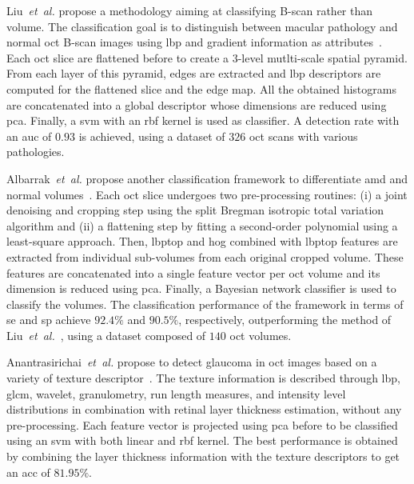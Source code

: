 %
Liu~\textit{et~al.} propose a methodology aiming at classifying B-scan rather than volume.
The classification goal is to distinguish between macular pathology and normal \gls{oct} B-scan images using \gls{lbp} and gradient information as attributes~\cite{Liu2011}.
%
Each \gls{oct} slice are flattened before to create a $3$-level mutlti-scale spatial pyramid.
From each layer of this pyramid, edges are extracted and \gls{lbp} descriptors are computed for the flattened slice and the edge map.
All the obtained histograms are concatenated into a global descriptor whose dimensions are reduced using \gls{pca}.
Finally, a \gls{svm} with an \gls{rbf} kernel is used as classifier.
%
A detection rate with an \gls{auc} of $0.93$ is achieved, using a dataset of $326$ \gls{oct} scans with various pathologies.

Albarrak~\textit{et~al.} propose another classification framework to differentiate \gls{amd} and normal volumes~\cite{albarrak2013age}.
%
Each \gls{oct} slice undergoes two pre-processing routines: (i) a joint denoising and cropping step using the split Bregman isotropic total variation algorithm and (ii) a flattening step by fitting a second-order polynomial using a least-square approach.
Then, \gls{lbptop} and \gls{hog} combined with \gls{lbptop} features are extracted from individual sub-volumes from each original cropped volume.
These features are concatenated into a single feature vector per \gls{oct} volume and its dimension is reduced using \gls{pca}.
Finally, a Bayesian network classifier is used to classify the volumes.
%
The classification performance of the framework in terms of \gls{se} and \gls{sp} achieve $92.4 \%$ and $90.5 \%$, respectively, outperforming the method of Liu~\emph{et~al.}~\cite{Liu2011}, using a dataset composed of $140$ \gls{oct} volumes.

Anantrasirichai~\textit{et~al.} propose to detect glaucoma in \gls{oct} images based on a variety of texture descriptor~\cite{anantrasirichai2013svm}.
%
The texture information is described through \gls{lbp}, \gls{glcm}, wavelet, granulometry, run length measures, and intensity level distributions in combination with retinal layer thickness estimation, without any pre-processing.
Each feature vector is projected using \gls{pca} before to be classified using an \gls{svm} with both linear and \gls{rbf} kernel.
%
The best performance is obtained by combining the layer thickness information with the texture descriptors to get an \gls{acc} of $81.95 \%$.

